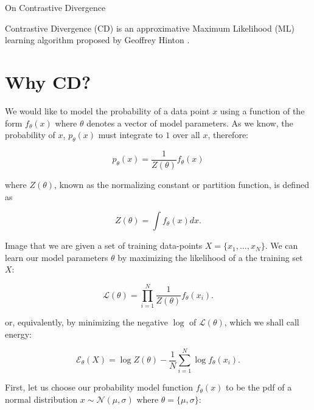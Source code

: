\documentclass[11pt]{article}
\begin{document}
\begin{center}
{\huge On Contrastive Divergence} 
\end{center}

Contrastive Divergence (CD) is an approximative Maximum Likelihood (ML) learning algorithm proposed by Geoffrey Hinton \cite{Hinton:2002, carreiraperpinan:2005}.


\section{Why CD?}

We would like to model the probability of a data point $x$ using a function of the form $f_\theta(x)$ where $\theta$ denotes a vector of model parameters. As we know, the probability of $x$, $p_\theta(x)$ must integrate to $1$ over all $x$, therefore:

\begin{equation}
p_\theta(x) = \frac{1}{Z(\theta)}f_\theta(x)
\end{equation}

where $Z(\theta)$, known as the normalizing constant or partition function, is defined as

\begin{equation}
Z(\theta) = \int f_\theta(x) dx.
\label{eq:partition}
\end{equation}

Image that we are given a set of training data-points $X=\{x_1,\ldots,x_N\}$. We can learn our model parameters $\theta$ by maximizing the likelihood of a the training set $X$:

\begin{equation}
\mathcal{L} (\theta) = \prod_{i=1}^N \frac{1}{Z(\theta)} f_\theta(x_i).
\end{equation}

or, equivalently, by minimizing the negative $\log$ of $\mathcal{L}(\theta)$, which we shall call energy:

\begin{equation}
\mathcal{E}_\theta(X) = \log Z(\theta) - \frac{1}{N} \sum_{i=1}^N \log f_\theta(x_i).
\label{eq:energy}
\end{equation}

First, let us choose our probability model function $f_\theta(x)$ to be the pdf of a normal distribution $x\sim\mathcal{N}(\mu, \sigma)$ where $\theta = \{\mu,\sigma\}$:
\end{document}
